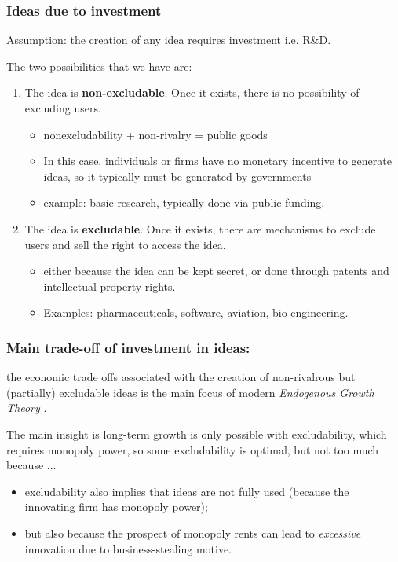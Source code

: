 \documentclass[11pt]{article}
\begin{document}
\subsubsection{Ideas due to investment}

Assumption: the creation of any idea requires investment i.e. R\&D. 

The two possibilities that we have are:
\begin{enumerate}
    \item The idea is \textbf{non-excludable}. Once it exists, there is no possibility of excluding users.
    \begin{itemize}
        \item nonexcludability + non-rivalry = public goods
        \item In this case, individuals or firms have no monetary incentive to generate ideas, so it typically must be generated by governments
        \item example: basic research, typically done via public funding.
    \end{itemize}
    \item The idea is \textbf{excludable}. Once it exists, there are mechanisms to exclude users and sell the right to access the idea.
    \begin{itemize}
        \item either because the idea can be kept secret, or done through patents and intellectual property rights.
        \item Examples: pharmaceuticals, software, aviation, bio engineering.
    \end{itemize}
\end{enumerate}

\subsubsection{Main trade-off of investment in ideas:}

the economic trade offs associated with the creation of non-rivalrous  but (partially) excludable ideas is the main focus of modern \textit{Endogenous Growth Theory} \cite{romer1990}.

The main insight is long-term growth is only possible with excludability, which requires monopoly power, so some excludability is optimal, but not too much because $\ldots$
\begin{itemize}
    \item excludability also implies that ideas are not fully used (because the innovating firm has monopoly power);
    \item but also because the prospect of monopoly rents can lead to \textit{excessive} innovation due to business-stealing motive.
\end{itemize}
\end{document}
